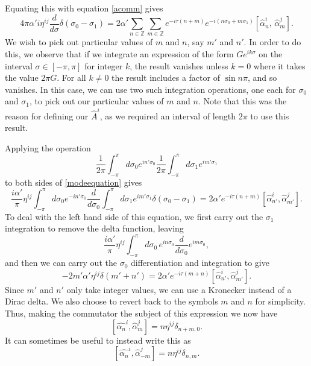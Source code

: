 \documentclass[a4paper,12pt]{article}
\numberwithin{equation}{section}
\begin{document}
Equating this with equation \ref{acomm} gives
\begin{equation}\label{modeequation}
4\pi\alpha'i\eta^{i j} \frac{d}{d\sigma}\delta(\sigma_0-\sigma_1) = 2\alpha'\sum_{n \in \mathbb{Z}}\sum_{m\in\mathbb{Z}}e^{-i\tau(n+m)}e^{-i(n\sigma_0 + m\sigma_1)}\left[\hat{\alpha}_n^i,\,\hat{\alpha}_m^j\right].
\end{equation}
We wish to pick out particular values of $m$ and $n$, say $m'$ and $n'$. In order to do this, we observe that if we integrate an expression of the form $Ge^{ik\sigma}$ on the interval $\sigma \in [-\pi,\pi]$ for integer $k$, the result vanishes unless $k=0$ where it takes the value $2\pi G$. For all $k \ne 0$ the result includes a factor of $\sin n\pi$, and so vanishes.  In this case, we can use two such integration operations, one each for $\sigma_0$ and $\sigma_1$, to pick out our particular values of $m$ and $n$. Note that this was the reason for defining our $\hat{A}^i$, as we required an interval of length $2\pi$ to use this result.

 Applying the operation
\begin{equation}
\frac{1}{2\pi}\int_{-\pi}^\pi d\sigma_0e^{in'\sigma_0}\frac{1}{2\pi}\int_{-\pi}^\pi d\sigma_1 e^{im'\sigma_1}
\end{equation}
to both sides of \ref{modeequation} gives 
\begin{equation}
\frac{i\alpha'}{\pi}\eta^{i j}\int_{-\pi}^{\pi}d\sigma_0 e^{-in'\sigma_0}\frac{d}{d\sigma_0}\int_{-\pi}^\pi d\sigma_1 e^{im'\sigma_1}\delta(\sigma_0-\sigma_1) = 2\alpha'e^{-i\tau(n+m)}\left[\hat{\alpha}_{n'}^i,\hat{\alpha}_{m'}^j\right].
\end{equation}
To deal with the left hand side of this equation, we first carry out the $\sigma_1$ integration to remove the delta function, leaving
\begin{equation}
\frac{i\alpha'}{\pi}\eta^{ij}\int_{-\pi}^\pi d\sigma_0\, e^{in\sigma_0}\frac{d}{d\sigma_0}e^{im\sigma_0},
\end{equation}
and then we can carry out the $\sigma_0$ differentiation and integration to give
\begin{equation}
-2m'\alpha'\eta^{ij}\delta(m'+n') = 2\alpha'e^{-i\tau(m+n)}\left[\hat{\alpha}_{n'}^i,\hat{\alpha}_{m'}^j\right].
\end{equation}
Since $m'$ and $n'$ only take integer values, we can use a Kronecker instead of a Dirac delta. We also choose to revert back to the symbols $m$ and $n$ for simplicity. Thus, making the commutator the subject of this expression we now have
\begin{equation}\label{alphacommutation}
\left[\hat{\alpha_n}^i,\hat{\alpha}_m^j\right] = n\eta^{ij}\delta_{n+m,0}.
\end{equation}
It can sometimes be useful to instead write this as 
\begin{equation}
\left[\hat{\alpha_n}^i,\hat{\alpha}_{-m}^j\right] = n\eta^{ij}\delta_{n,m}.
\end{equation}
\end{document}
